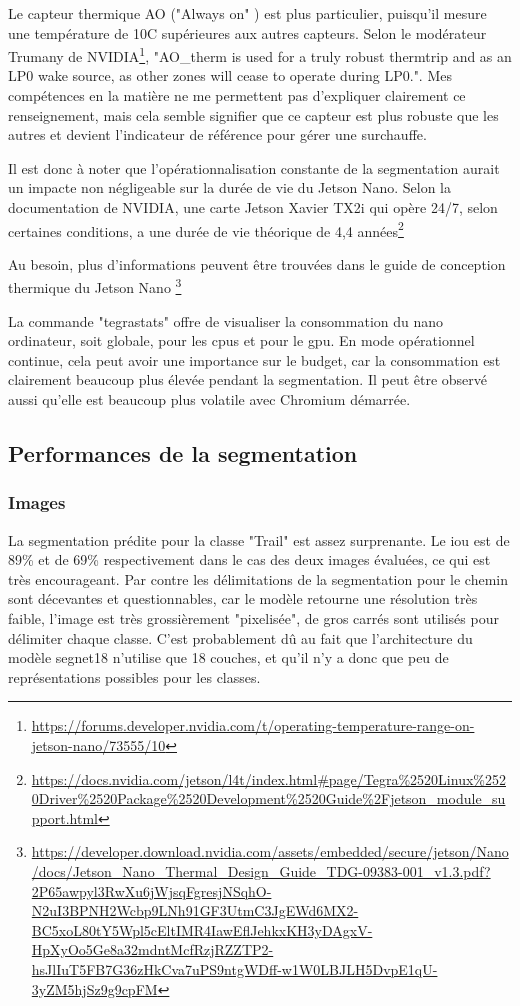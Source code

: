 \par Le capteur thermique AO ("Always on" ) est plus particulier, puisqu'il mesure une température de 10C supérieures aux autres capteurs. Selon le modérateur Trumany de NVIDIA\footnote{\url{https://forums.developer.nvidia.com/t/operating-temperature-range-on-jetson-nano/73555/10}}, "AO\_therm is used for a truly robust thermtrip and as an LP0 wake source, as other zones will cease to operate during LP0.". Mes compétences en la matière ne me permettent pas d'expliquer clairement ce renseignement, mais cela semble signifier que ce capteur est plus robuste que les autres et devient l'indicateur de référence pour gérer une surchauffe. 
\par Il est donc à noter que l'opérationnalisation constante de la segmentation aurait un impacte non négligeable sur la durée de vie du Jetson Nano. Selon la documentation de NVIDIA, une carte Jetson Xavier TX2i qui opère 24/7, selon certaines conditions, a une durée de vie théorique de 4,4 années\footnote{\url{https://docs.nvidia.com/jetson/l4t/index.html#page/Tegra\%2520Linux\%2520Driver\%2520Package\%2520Development\%2520Guide\%2Fjetson_module_support.html}}
\par Au besoin, plus d'informations peuvent être trouvées dans le guide de conception thermique du Jetson Nano \footnote{\url{https://developer.download.nvidia.com/assets/embedded/secure/jetson/Nano/docs/Jetson_Nano_Thermal_Design_Guide_TDG-09383-001_v1.3.pdf?2P65awpyl3RwXu6jWjsqFgresjNSqhO-N2uI3BPNH2Wcbp9LNh91GF3UtmC3JgEWd6MX2-BC5xoL80tY5Wpl5cEltIMR4IawEflJehkxKH3yDAgxV-HpXyOo5Ge8a32mdntMcfRzjRZZTP2-hsJlIuT5FB7G36zHkCva7uPS9ntgWDff-w1W0LBJLH5DvpE1qU-3yZM5hjSz9g9cpFM}}
\par La commande "tegrastats" offre de visualiser la consommation du nano ordinateur, soit globale, pour les \acrshort{cpu}s et pour le \acrshort{gpu}. En mode opérationnel continue, cela peut avoir une importance sur le budget, car la consommation est clairement beaucoup plus élevée pendant la segmentation. Il peut être observé aussi qu'elle est beaucoup plus volatile avec Chromium démarrée. 
\subsection{Performances de la segmentation}
\subsubsection{Images}
La segmentation prédite pour la classe "Trail" est assez surprenante. Le \acrshort{iou} est de 89\% et de 69\% respectivement dans le cas des deux images évaluées, ce qui est très encourageant. Par contre les délimitations de la segmentation pour le chemin sont décevantes et questionnables, car le modèle retourne une résolution très faible, l'image est très grossièrement "pixelisée", de gros carrés sont utilisés pour délimiter chaque classe. C'est probablement dû au fait que l'architecture du modèle segnet18 n'utilise que 18 couches, et qu'il n'y a donc que peu de représentations possibles pour les classes. 
